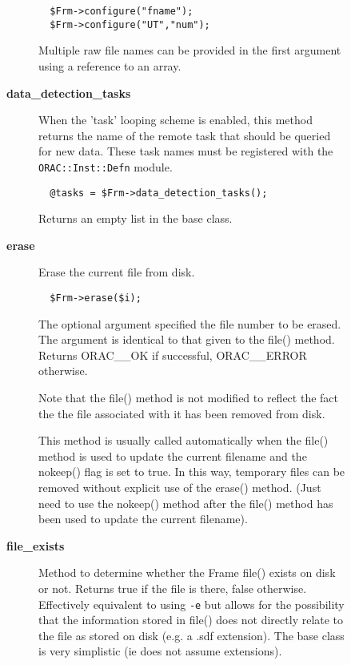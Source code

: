 \begin{description}
\begin{description}
\begin{description}
\begin{verbatim}
  $Frm->configure("fname");
  $Frm->configure("UT","num");
\end{verbatim}


Multiple raw file names can be provided in the first argument using
a reference to an array.


\item[{\textbf{data\_detection\_tasks}}] \mbox{}

When the 'task' looping scheme is enabled, this method returns the name
of the remote task that should be queried for new data. These task names
must be registered with the \texttt{ORAC::Inst::Defn} module.

\begin{verbatim}
  @tasks = $Frm->data_detection_tasks();
\end{verbatim}


Returns an empty list in the base class.


\item[{\textbf{erase}}] \mbox{}

Erase the current file from disk.

\begin{verbatim}
  $Frm->erase($i);
\end{verbatim}


The optional argument specified the file number to be erased.
The argument is identical to that given to the file() method.
Returns ORAC\_\_OK if successful, ORAC\_\_ERROR otherwise.



Note that the file() method is not modified to reflect the
fact the the file associated with it has been removed from disk.



This method is usually called automatically when the file()
method is used to update the current filename and the nokeep()
flag is set to true. In this way, temporary files can be removed
without explicit use of the erase() method. (Just need to
use the nokeep() method after the file() method has been used
to update the current filename).


\item[{\textbf{file\_exists}}] \mbox{}

Method to determine whether the Frame file() exists on disk or not.
Returns true if the file is there, false otherwise. Effectively
equivalent to using \texttt{-e} but allows for the possibility that the
information stored in file() does not directly relate to the
file as stored on disk (e.g. a .sdf extension). The base class is
very simplistic (ie does not assume extensions).


\end{description}
\end{description}
\end{description}
